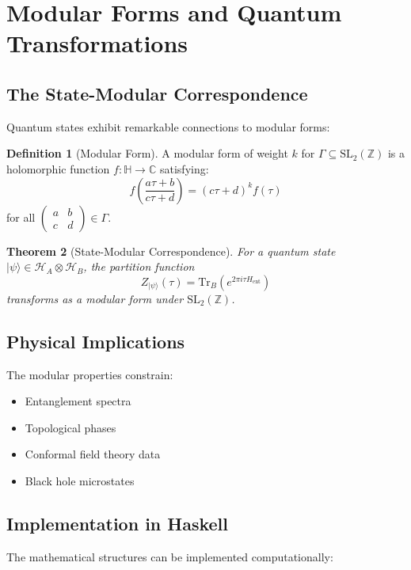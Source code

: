 \documentclass[12pt,a4paper]{article}
\theoremstyle{plain}
\newtheorem{theorem}{Theorem}[section]
\theoremstyle{definition}
\newtheorem{definition}[theorem]{Definition}
\theoremstyle{remark}
\begin{document}
\section{Modular Forms and Quantum Transformations}

\subsection{The State-Modular Correspondence}

Quantum states exhibit remarkable connections to modular forms:

\begin{definition}[Modular Form]
A modular form of weight $k$ for $\Gamma \subseteq \text{SL}_2(\mathbb{Z})$ is a holomorphic function $f: \mathbb{H} \to \mathbb{C}$ satisfying:
\[f\left(\frac{a\tau + b}{c\tau + d}\right) = (c\tau + d)^k f(\tau)\]
for all $\begin{pmatrix} a & b \\ c & d \end{pmatrix} \in \Gamma$.
\end{definition}

\begin{theorem}[State-Modular Correspondence]
For a quantum state $|\psi\rangle \in \mathcal{H}_A \otimes \mathcal{H}_B$, the partition function
\[Z_{|\psi\rangle}(\tau) = \text{Tr}_B\left(e^{2\pi i \tau H_{\text{ent}}}\right)\]
transforms as a modular form under $\text{SL}_2(\mathbb{Z})$.
\end{theorem}

\subsection{Physical Implications}

The modular properties constrain:
\begin{itemize}
\item Entanglement spectra
\item Topological phases
\item Conformal field theory data
\item Black hole microstates
\end{itemize}

\subsection{Implementation in Haskell}

The mathematical structures can be implemented computationally:
\end{document}
